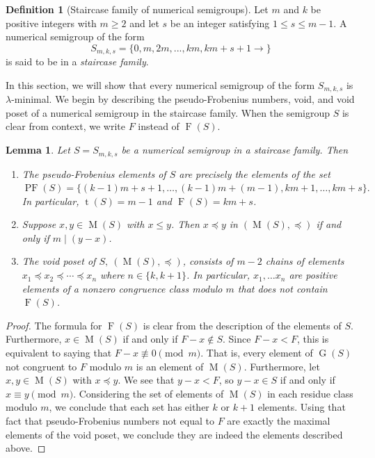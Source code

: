 \documentclass{amsproc}
\DeclareMathOperator{\F}{F}
\DeclareMathOperator{\G}{G}
\DeclareMathOperator{\PF}{PF}
\DeclareMathOperator{\type}{t}
\DeclareMathOperator{\M}{M}
\newtheorem{lemma}[theorem]{Lemma}
\theoremstyle{definition}
\newtheorem{definition}[theorem]{Definition}
\theoremstyle{remark}
\numberwithin{equation}{section}
\begin{document}
\begin{definition}[Staircase family of numerical semigroups]
    \label{def:staircase}
    Let $m$ and $k $ be positive integers with $m \ge 2$ and let $s$ be an integer satisfying $1 \le s \le m-1$. A numerical semigroup of the form 
    \[
    S_{m, k, s}=\{0,m,2m,...,km,km+s+1\rightarrow\}
    \]
    is said to be in a \emph{staircase family}. 
\end{definition}
In this section, we will show that every numerical semigroup of the form $S_{m,k,s}$ is $\lambda$-minimal. We begin by describing the pseudo-Frobenius numbers, void, and void poset of a numerical semigroup in the staircase family. When the semigroup $S$ is clear from context, we write $F$ instead of $\F(S)$.  
\begin{lemma}\label{lem:staircase}
Let $S = S_{m,k,s}$ be a numerical semigroup in a staircase family. Then 
\begin{enumerate}
    \item The pseudo-Frobenius elements of $S$ are precisely the elements of the set 
    $\PF(S) = \{(k-1)m+s+1,\ldots, (k-1)m +(m-1), km+1,\ldots, km+s\}.$
    In particular, $\type(S) = m -1$ and $\F(S) = km + s$.
    \item Suppose $x, y \in \M(S)$ with $x \le y$.  Then $x\preccurlyeq y$ in $(\M(S),\preccurlyeq)$ if and only if $m \mid (y-x)$.

    \item The void poset of $S,\ (\M(S),\preccurlyeq)$, consists of $m-2$ chains of elements $x_1\preccurlyeq x_2\preccurlyeq\cdots\preccurlyeq x_n$ where $n \in \{k,k+1\}$. In particular, $x_1, \dots x_n$ are positive elements of a nonzero congruence class modulo $m$ that does not contain $\F(S)$.
\end{enumerate}
\end{lemma}

\begin{proof}
The formula for $\F(S)$ is clear from the description of the elements of $S$.  Furthermore,  $x \in \M(S)$ if and only if $F-x \notin S$. Since $F-x < F$, this is equivalent to saying that $F - x \not\equiv 0 \pmod{m}$. That is, every element of $\G(S)$ not congruent to $F$ modulo $m$ is an element of $\M(S)$. Furthermore, let $x,y\in \M(S)$ with $x \preccurlyeq y$.  We see that $y-x <F$, so $y - x \in S$ if and only if $x \equiv y \pmod{m}$. Considering the set of elements of $\M(S)$ in each residue class modulo $m$, we conclude that each set has either $k$ or $k+1$ elements. Using that fact that pseudo-Frobenius numbers not equal to $F$ are exactly the maximal elements of the void poset, we conclude they are indeed the elements described above. 
\end{proof}
\end{document}
